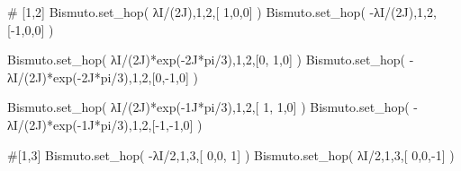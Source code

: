 \documentclass[
  letterpaper,
  DIV=11,
  numbers=noendperiod]{scrreprt}
\newenvironment{Shaded}{\begin{snugshade}}{\end{snugshade}}
\newcommand{\CommentTok}[1]{\textcolor[rgb]{0.37,0.37,0.37}{#1}}
\newcommand{\DecValTok}[1]{\textcolor[rgb]{0.68,0.00,0.00}{#1}}
\newcommand{\NormalTok}[1]{\textcolor[rgb]{0.00,0.23,0.31}{#1}}
\newcommand{\OperatorTok}[1]{\textcolor[rgb]{0.37,0.37,0.37}{#1}}
\newcommand{\OtherTok}[1]{\textcolor[rgb]{0.00,0.23,0.31}{#1}}
\begin{document}
\begin{Shaded}
\begin{Highlighting}[]
\CommentTok{\# [1,2]}
\NormalTok{Bismuto.set\_hop(  λI}\OperatorTok{/}\NormalTok{(}\OtherTok{2J}\NormalTok{),}\DecValTok{1}\NormalTok{,}\DecValTok{2}\NormalTok{,[ }\DecValTok{1}\NormalTok{,}\DecValTok{0}\NormalTok{,}\DecValTok{0}\NormalTok{] ) }
\NormalTok{Bismuto.set\_hop( }\OperatorTok{{-}}\NormalTok{λI}\OperatorTok{/}\NormalTok{(}\OtherTok{2J}\NormalTok{),}\DecValTok{1}\NormalTok{,}\DecValTok{2}\NormalTok{,[}\OperatorTok{{-}}\DecValTok{1}\NormalTok{,}\DecValTok{0}\NormalTok{,}\DecValTok{0}\NormalTok{] ) }

\NormalTok{Bismuto.set\_hop(  λI}\OperatorTok{/}\NormalTok{(}\OtherTok{2J}\NormalTok{)}\OperatorTok{*}\NormalTok{exp(}\OperatorTok{{-}}\OtherTok{2J}\OperatorTok{*}\NormalTok{pi}\OperatorTok{/}\DecValTok{3}\NormalTok{),}\DecValTok{1}\NormalTok{,}\DecValTok{2}\NormalTok{,[}\DecValTok{0}\NormalTok{, }\DecValTok{1}\NormalTok{,}\DecValTok{0}\NormalTok{] ) }
\NormalTok{Bismuto.set\_hop( }\OperatorTok{{-}}\NormalTok{λI}\OperatorTok{/}\NormalTok{(}\OtherTok{2J}\NormalTok{)}\OperatorTok{*}\NormalTok{exp(}\OperatorTok{{-}}\OtherTok{2J}\OperatorTok{*}\NormalTok{pi}\OperatorTok{/}\DecValTok{3}\NormalTok{),}\DecValTok{1}\NormalTok{,}\DecValTok{2}\NormalTok{,[}\DecValTok{0}\NormalTok{,}\OperatorTok{{-}}\DecValTok{1}\NormalTok{,}\DecValTok{0}\NormalTok{] ) }

\NormalTok{Bismuto.set\_hop(  λI}\OperatorTok{/}\NormalTok{(}\OtherTok{2J}\NormalTok{)}\OperatorTok{*}\NormalTok{exp(}\OperatorTok{{-}}\OtherTok{1J}\OperatorTok{*}\NormalTok{pi}\OperatorTok{/}\DecValTok{3}\NormalTok{),}\DecValTok{1}\NormalTok{,}\DecValTok{2}\NormalTok{,[ }\DecValTok{1}\NormalTok{, }\DecValTok{1}\NormalTok{,}\DecValTok{0}\NormalTok{] ) }
\NormalTok{Bismuto.set\_hop( }\OperatorTok{{-}}\NormalTok{λI}\OperatorTok{/}\NormalTok{(}\OtherTok{2J}\NormalTok{)}\OperatorTok{*}\NormalTok{exp(}\OperatorTok{{-}}\OtherTok{1J}\OperatorTok{*}\NormalTok{pi}\OperatorTok{/}\DecValTok{3}\NormalTok{),}\DecValTok{1}\NormalTok{,}\DecValTok{2}\NormalTok{,[}\OperatorTok{{-}}\DecValTok{1}\NormalTok{,}\OperatorTok{{-}}\DecValTok{1}\NormalTok{,}\DecValTok{0}\NormalTok{] ) }
\end{Highlighting}
\end{Shaded}

\begin{Shaded}
\begin{Highlighting}[]
\CommentTok{\#[1,3]}
\NormalTok{Bismuto.set\_hop( }\OperatorTok{{-}}\NormalTok{λI}\OperatorTok{/}\DecValTok{2}\NormalTok{,}\DecValTok{1}\NormalTok{,}\DecValTok{3}\NormalTok{,[ }\DecValTok{0}\NormalTok{,}\DecValTok{0}\NormalTok{, }\DecValTok{1}\NormalTok{] ) }
\NormalTok{Bismuto.set\_hop(  λI}\OperatorTok{/}\DecValTok{2}\NormalTok{,}\DecValTok{1}\NormalTok{,}\DecValTok{3}\NormalTok{,[ }\DecValTok{0}\NormalTok{,}\DecValTok{0}\NormalTok{,}\OperatorTok{{-}}\DecValTok{1}\NormalTok{] ) }
\end{Highlighting}
\end{Shaded}
\end{document}
